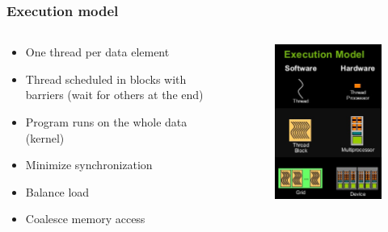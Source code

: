 \begin{frame}
  \frametitle{Execution model}
  \begin{columns}[onlytextwidth]

    \begin{column}{0.5\textwidth}
      \begin{itemize}
        \item One thread per data element
        \item Thread scheduled in blocks with barriers (wait for others at the end)
        \item Program runs on the whole data (kernel)
      \end{itemize}
      \begin{itemize}
        \item Minimize synchronization
        \item Balance load
        \item Coalesce memory access
      \end{itemize}
    \end{column}

    \begin{column}{0.5\textwidth}
      \begin{figure}[t]
        \centering
        \includegraphics[width=\textwidth, height=0.8\textheight, keepaspectratio]{imgs/cuda}
      \end{figure}
    \end{column}
  \end{columns}


\end{frame}
